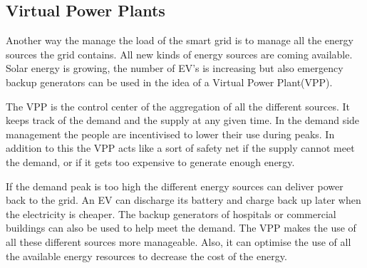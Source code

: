 \subsection{Virtual Power Plants}
Another way the manage the load of the smart grid is to manage all the energy sources the grid contains. All new kinds of energy sources are coming available. Solar energy is growing, the number of EV's is increasing but also emergency backup generators can be used in the idea of a Virtual Power Plant(VPP). 

The VPP is the control center of the aggregation of all the different sources. It keeps track of the demand and the supply at any given time. In the demand side management the people are incentivised to lower their use during peaks. In addition to this the VPP acts like a sort of safety net if the supply cannot meet the demand, or if it gets too expensive to generate enough energy. 

If the demand peak is too high the different energy sources can deliver power back to the grid. An EV can discharge its battery and charge back up later when the electricity is cheaper. The backup generators of hospitals or commercial buildings can also be used to help meet the demand. The VPP makes the use of all these different sources more manageable. Also, it can optimise the use of all the available energy resources to decrease the cost of the energy.

